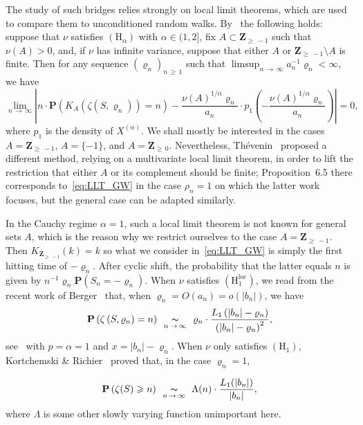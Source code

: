 \documentclass[10pt]{amsart}
\theoremstyle{definition}\newtheorem{defi}[theo]{Definition}\newtheorem{rema}[theo]{Remark}\newtheorem{exam}[theo]{Example}\newtheorem{exem}[theo]{Example}\newtheorem{nota}[theo]{Notation}
\newcommand{\ensembles}[1]{\mathbf{#1}}
\newcommand{\Z}{\ensembles{Z}}
\renewcommand{\P}{\ensembles{P}}
\renewcommand{\Pr}[1]{\P\left(#1\right)}
\newcommand{\1}{\ensembles{1}}
\renewcommand{\ge}{\geqslant}
\newcommand{\Xmap}{X}
\newcommand{\Hrm}{\mathrm{H}}
\newcommand{\Hrmloc}{\mathrm{(H_1^{loc})}}
\newcommand{\Hrmalp}{\mathrm{(H_\alpha)}}
\newcommand{\equivalent}[1][n]{\enskip\mathop{\thicksim}^{}_{#1\,\to\,\infty}\enskip}
\providecommand{\?}{}
\begin{document}
The study of such bridges relies strongly on local limit theorems, which are used to compare them to unconditioned random walks. By~\cite[Equation~50]{Kor12} the following holds: suppose that $\nu$ satisfies $\Hrmalp$ with $\alpha \in (1, 2]$, fix $A \subset \Z_{\ge\,-1}$ such that $\nu(A) > 0$, and, if $\nu$ has infinite variance, suppose that either $A$ or $\Z_{\ge\,-1} \setminus A$ is finite. Then for any sequence $(\varrho_n)_{n\,\ge\,1}$ such that $\limsup_{n\,\to\, \infty} a_n^{-1} \varrho_n < \infty$, we have
\begin{equation}\label{eq:LLT_GW}
\lim_{n\,\to\,\infty} \left|n \cdot \Pr{K_A\left(\zeta\left(S, \varrho_n\right)\right) = n} - \frac{\nu(A)^{1/\alpha} \varrho_n}{a_n} \cdot p_1\left(- \frac{\nu(A)^{1/\alpha} \varrho_n}{a_n}\right)\right| = 0,
\end{equation}
where $p_1$ is the density of $\Xmap^{(\alpha)}$. We shall mostly be interested in the cases $A = \Z_{\ge\,-1}$, $A = \{-1\}$, and $A = \Z_{\ge\,0}$. Nevertheless, Thévenin~\cite{The20} proposed a different method, relying on a multivariate local limit theorem, in order to lift the restriction that either $A$ or its complement should be finite; Proposition~6.5 there corresponds to~\eqref{eq:LLT_GW} in the case $\rho_n=1$ on which the latter work focuses, but the general case can be adapted similarly.

In the Cauchy regime $\alpha = 1$, such a local limit theorem is not known for general sets $A$, which is the reason why we restrict ourselves to the case $A = \Z_{\ge\,-1}$. Then $K_{\Z_{\ge\,-1}}(k) = k$ so what we consider in~\eqref{eq:LLT_GW} is simply the first hitting time of $-\varrho_n$. After cyclic shift, the probability that the latter equals $n$ is given by $n^{-1} \varrho_n \P(S_n = - \varrho_n)$. When $\nu$ satisfies $\Hrmloc$, we read from the recent work of Berger~\cite[Theorem~2.4]{Ber19} that, when $\varrho_n = O(a_n) = o(|b_n|)$, we have
\begin{equation}\label{eq:LLT_GW_Cauchy_loc}
\Pr{\zeta\left(S, \varrho_n\right) = n}
\equivalent
\varrho_n \cdot \frac{L_1\left(|b_n| - \varrho_n\right)}{\left(|b_n| - \varrho_n\right)^2},
\end{equation}
see~\cite[Equation~2.10]{Ber19} with $p = \alpha = 1$ and $x = |b_n| - \varrho_n$. When $\nu$ only satisfies $(\Hrm_1)$, Kortchemski \& Richier~\cite[Proposition~12]{KR19} proved that, in the case $\varrho_n = 1$,

\begin{equation}\label{eq:LLT_GW_Cauchy_gen}
\Pr{\zeta(S) \ge n}
\equivalent
\Lambda(n) \cdot \frac{L_1(|b_n|)}{|b_n|},
\end{equation}
where $\Lambda$ is some other slowly varying function unimportant here.
\end{document}
